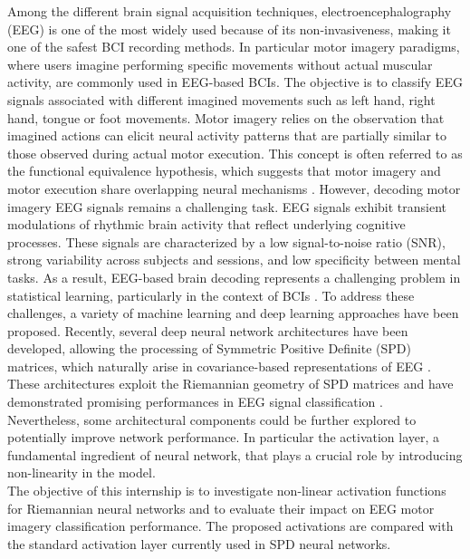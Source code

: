 \documentclass[11pt,a4paper]{article}
\begin{document}
Among the different brain signal acquisition techniques, electroencephalography (EEG) is one of the most widely used because of its non-invasiveness, making it one of the safest BCI recording methods.
In particular motor imagery paradigms, where users imagine performing specific movements without actual muscular activity, are commonly used in EEG-based BCIs. The objective is to classify EEG signals associated with different imagined movements such as left hand, right hand, tongue or foot movements. 
Motor imagery relies on the observation that imagined actions can elicit neural activity patterns that are partially similar to those observed during actual motor execution. This concept is often referred to as the functional equivalence hypothesis, which suggests that motor imagery and motor execution share overlapping neural mechanisms \cite{Sim} \cite{Sim2}. However, decoding motor imagery EEG signals remains a challenging task. EEG signals exhibit transient modulations of rhythmic brain activity that reflect underlying cognitive processes. These signals are characterized by a low signal-to-noise ratio (SNR), strong variability across subjects and sessions, and low specificity between mental tasks. As a result, EEG-based brain decoding represents a challenging problem in statistical learning, particularly in the context of BCIs \cite{weak}.
\newline
To address these challenges, a variety of machine learning and deep learning approaches have been proposed.
Recently, several deep neural network architectures have been developed, allowing the processing of Symmetric Positive Definite (SPD) matrices, which naturally arise in covariance-based representations of EEG \cite{marco2017}. These architectures exploit the Riemannian geometry of SPD matrices and have demonstrated promising performances in EEG signal classification \cite{SPDlearning}. \\


Nevertheless, some architectural components could be further explored to potentially improve network performance. In particular the activation layer, a fundamental ingredient of neural network, that plays a crucial role by introducing non-linearity in the model. \\

The objective of this internship is to investigate non-linear activation functions for Riemannian neural networks and to evaluate their impact on EEG motor imagery classification performance. The proposed activations are compared with the standard activation layer currently used in SPD neural networks. \\
\end{document}

